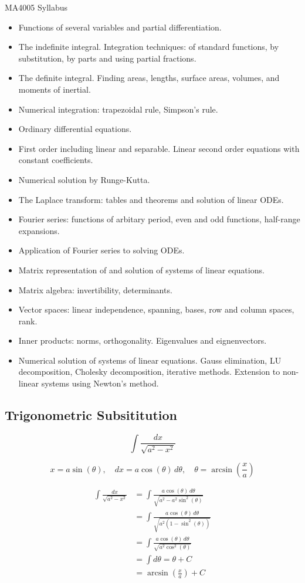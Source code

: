 \documentclass[12pt, a4paper]{article}
\begin{document}
\author{Kevin O'Brien}

MA4005 Syllabus
\begin{itemize}
\item Functions of several variables and partial differentiation.
\item The indefinite integral. Integration techniques: of standard functions, by substitution, by parts and using partial fractions.
\item The definite integral. Finding areas, lengths, surface areas, volumes, and moments of inertial.
\item Numerical integration: trapezoidal rule, Simpson's rule.
\item Ordinary differential equations.
\item First order including linear and separable. Linear second order equations with constant coefficients.
\item Numerical solution by Runge-Kutta. 
\item The Laplace transform: tables and theorems and solution of linear ODEs.
\item Fourier series: functions of arbitary period, even and odd functions, half-range expansions.
\item Application of Fourier series to solving ODEs.
\item Matrix representation of and solution of systems of linear equations.
\item Matrix algebra: invertibility, determinants.
\item Vector spaces: linear independence, spanning, bases, row and column spaces, rank.
\item Inner products: norms, orthogonality. Eigenvalues and eignenvectors.
\item Numerical solution of systems of linear equations. Gauss elimination, LU decomposition, Cholesky decomposition,
iterative methods. Extension to non-linear systems using Newton's method.
\end{itemize}
\newpage
\subsection*{Trigonometric Subsititution}
\[\int\frac{dx}{\sqrt{a^2-x^2}}\]

\[x=a\sin(\theta),\quad dx=a\cos(\theta)\,d\theta, \quad \theta=\arcsin\left(\frac{x}{a}\right)\]

{\large
\begin{eqnarray}
\int\frac{dx}{\sqrt{a^2-x^2}} & = \int\frac{a\cos(\theta)\,d\theta}{\sqrt{a^2-a^2\sin^2(\theta)}}\\ \nonumber &= \int\frac{a\cos(\theta)\,d\theta}{\sqrt{a^2(1-\sin^2(\theta))}} \\ \nonumber
& = \int\frac{a\cos(\theta)\,d\theta}{\sqrt{a^2\cos^2(\theta)}} \\ &= \int d\theta=\theta+C \\ \nonumber &=\arcsin\left(\frac{x}{a}\right)+C
\end{eqnarray}
}
\end{document}
